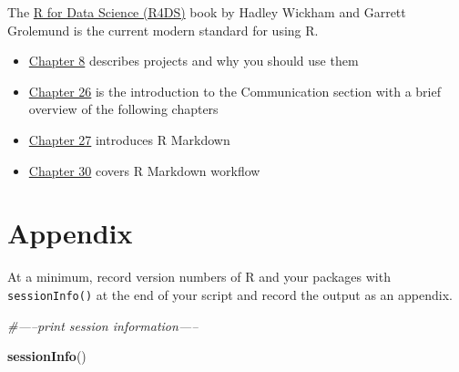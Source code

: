 \documentclass[
]{article}
\newenvironment{Shaded}{\begin{snugshade}}{\end{snugshade}}
\newcommand{\CommentTok}[1]{\textcolor[rgb]{0.56,0.35,0.01}{\textit{#1}}}
\newcommand{\KeywordTok}[1]{\textcolor[rgb]{0.13,0.29,0.53}{\textbf{#1}}}
\newcommand{\NormalTok}[1]{#1}
\providecommand{\tightlist}{%
  \setlength{\itemsep}{0pt}\setlength{\parskip}{0pt}}
\begin{document}
The \href{https://r4ds.had.co.nz/}{R for Data Science (R4DS)} book by
Hadley Wickham and Garrett Grolemund is the current modern standard for
using R.

\begin{itemize}
\tightlist
\item
  \href{https://r4ds.had.co.nz/workflow-projects.html}{Chapter 8}
  describes projects and why you should use them\\
\item
  \href{https://r4ds.had.co.nz/communicate-intro.html}{Chapter 26} is
  the introduction to the Communication section with a brief overview of
  the following chapters\\
\item
  \href{https://r4ds.had.co.nz/r-markdown.html}{Chapter 27} introduces R
  Markdown\\
\item
  \href{https://r4ds.had.co.nz/r-markdown-workflow.html}{Chapter 30}
  covers R Markdown workflow
\end{itemize}

\hypertarget{appendix}{%
\section{Appendix}\label{appendix}}

At a minimum, record version numbers of R and your packages with
\texttt{sessionInfo()} at the end of your script and record the output
as an appendix.

\begin{Shaded}
\begin{Highlighting}[]
\CommentTok{#-----print session information-----}

\KeywordTok{sessionInfo}\NormalTok{()}
\end{Highlighting}
\end{Shaded}
\end{document}
